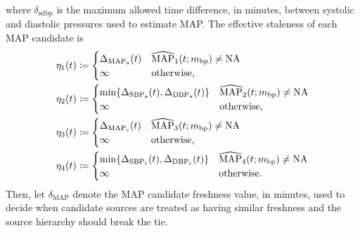 \documentclass[letterpaper,10pt]{article}
\begin{document}
where $\delta_{\mathrm{sdbp}}$ is the maximum allowed time difference, in
minutes, between systolic and diastolic pressures used to estimate MAP.
The effective staleness of each MAP candidate is
  \begin{equation}
    \label{eq:map-current-candidate-staleness}
    \begin{aligned}
    \eta_{1}(t) &\coloneqq
      \begin{cases}
        \Delta_{\mathrm{MAP}_{\mathrm{a}}}(t) &
        \widehat{\mathrm{MAP}}_{1}(t; m_{\mathrm{bp}}) \ne \mathrm{NA} \\
        \infty & \text{otherwise,}
      \end{cases} \\
    \eta_{2}(t) &\coloneqq
      \begin{cases}
        \min\{\Delta_{\mathrm{SBP}_{\mathrm{a}}}(t), \Delta_{\mathrm{DBP}_{\mathrm{a}}}(t)\} &
        \widehat{\mathrm{MAP}}_{2}(t; m_{\mathrm{bp}}) \ne \mathrm{NA} \\
        \infty & \text{otherwise,}
      \end{cases} \\
    \eta_{3}(t) &\coloneqq
      \begin{cases}
        \Delta_{\mathrm{MAP}_{\mathrm{c}}}(t) &
        \widehat{\mathrm{MAP}}_{3}(t; m_{\mathrm{bp}}) \ne \mathrm{NA} \\
        \infty & \text{otherwise,}
      \end{cases} \\
    \eta_{4}(t) &\coloneqq
      \begin{cases}
        \min\{\Delta_{\mathrm{SBP}_{\mathrm{c}}}(t), \Delta_{\mathrm{DBP}_{\mathrm{c}}}(t)\} &
        \widehat{\mathrm{MAP}}_{4}(t; m_{\mathrm{bp}}) \ne \mathrm{NA} \\
        \infty & \text{otherwise.}
      \end{cases}
  \end{aligned}
\end{equation}
Then, let $\delta_{\mathrm{MAP}}$ denote the MAP candidate freshness value, in
minutes, used to decide when candidate sources are treated as having similar
freshness and the source hierarchy should break the tie.
\end{document}
